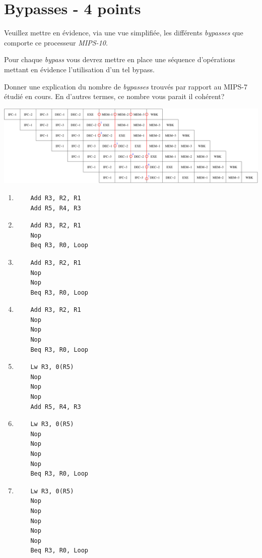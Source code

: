 %
%

\section{Bypasses - 4 points}

Veuillez mettre en \'evidence, via une vue simplifi\'ee, les diff\'erents
\textit{bypasses} que comporte ce processeur \textit{MIPS-10}.

Pour chaque \textit{bypass} vous devrez mettre en place une s\'equence
d'op\'erations mettant en \'evidence l'utilisation d'un tel bypass.

Donner une explication du nombre de \textit{bypasses} trouv\'es par rapport
au MIPS-7 \'etudi\'e en cours. En d'autres termes, ce nombre vous parait
il coh\'erent?

\begin{correction}

  \begin{center}
    \includegraphics[scale=0.45]{figures/correction-bypasses.pdf}
  \end{center}

  \begin{enumerate}
    \item
      \begin{verbatim}
	Add R3, R2, R1
	Add R5, R4, R3
      \end{verbatim}
    \item
      \begin{verbatim}
	Add R3, R2, R1
	Nop
	Beq R3, R0, Loop
      \end{verbatim}
    \item
      \begin{verbatim}
	Add R3, R2, R1
	Nop
	Nop
	Beq R3, R0, Loop
      \end{verbatim}
    \item
      \begin{verbatim}
	Add R3, R2, R1
	Nop
	Nop
	Nop
	Beq R3, R0, Loop
      \end{verbatim}
    \item
      \begin{verbatim}
	Lw R3, 0(R5)
	Nop
	Nop
	Nop
	Add R5, R4, R3
      \end{verbatim}
    \item
      \begin{verbatim}
	Lw R3, 0(R5)
	Nop
	Nop
	Nop
	Nop
	Beq R3, R0, Loop
      \end{verbatim}
    \item
      \begin{verbatim}
	Lw R3, 0(R5)
	Nop
	Nop
	Nop
	Nop
	Nop
	Beq R3, R0, Loop
      \end{verbatim}
  \end{enumerate}

\end{correction}

